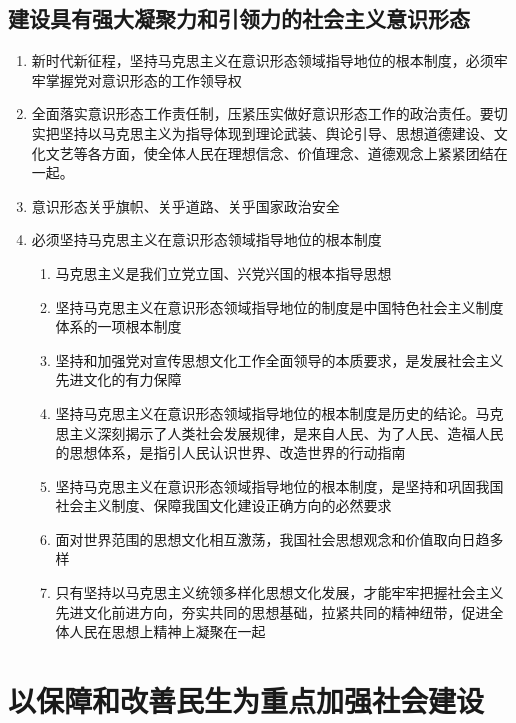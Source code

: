 \documentclass{ctexart}
\numberwithin{figure}{section}
\numberwithin{equation}{section}
\begin{document}
    \subsection{建设具有强大凝聚力和引领力的社会主义意识形态}
    \begin{enumerate}
        \item 新时代新征程，坚持马克思主义在意识形态领域指导地位的根本制度，必须牢牢掌握党对意识形态的工作领导权
        \item 全面落实意识形态工作责任制，压紧压实做好意识形态工作的政治责任。要切实把坚持以马克思主义为指导体现到理论武装、舆论引导、思想道德建设、文化文艺等各方面，使全体人民在理想信念、价值理念、道德观念上紧紧团结在一起。
        \item 意识形态关乎旗帜、关乎道路、关乎国家政治安全
        \item 必须坚持马克思主义在意识形态领域指导地位的根本制度
        \begin{enumerate}
            \item 马克思主义是我们立党立国、兴党兴国的根本指导思想
            \item 坚持马克思主义在意识形态领域指导地位的制度是中国特色社会主义制度体系的一项根本制度
            \item 坚持和加强党对宣传思想文化工作全面领导的本质要求，是发展社会主义先进文化的有力保障
            \item 坚持马克思主义在意识形态领域指导地位的根本制度是历史的结论。马克思主义深刻揭示了人类社会发展规律，是来自人民、为了人民、造福人民的思想体系，是指引人民认识世界、改造世界的行动指南
            \item 坚持马克思主义在意识形态领域指导地位的根本制度，是坚持和巩固我国社会主义制度、保障我国文化建设正确方向的必然要求
            \item 面对世界范围的思想文化相互激荡，我国社会思想观念和价值取向日趋多样
            \item 只有坚持以马克思主义统领多样化思想文化发展，才能牢牢把握社会主义先进文化前进方向，夯实共同的思想基础，拉紧共同的精神纽带，促进全体人民在思想上精神上凝聚在一起
        \end{enumerate}
    \end{enumerate}

\section{以保障和改善民生为重点加强社会建设}
\end{document}
